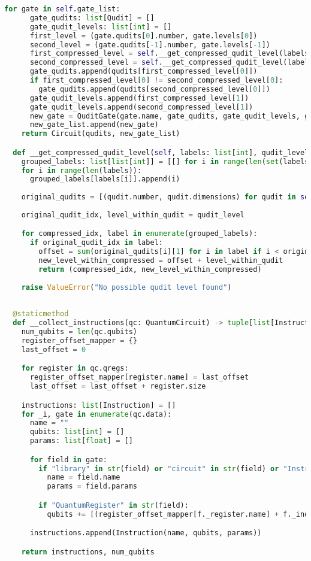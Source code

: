 \begin{lstlisting}[language=Python,caption=\texttt{circuit.py},label=lst:circuit.py]
    for gate in self.gate_list:
      gate_qudits: list[Qudit] = []
      gate_qudit_levels: list[int] = []
      first_level = (gate.qudits[0].number, gate.levels[0])
      second_level = (gate.qudits[-1].number, gate.levels[-1])
      first_compressed_level = self.__get_compressed_qudit_level(labels, first_level)
      second_compressed_level = self.__get_compressed_qudit_level(labels, second_level)
      gate_qudits.append(qudits[first_compressed_level[0]])
      if first_compressed_level[0] != second_compressed_level[0]:
        gate_qudits.append(qudits[second_compressed_level[0]])
      gate_qudit_levels.append(first_compressed_level[1])
      gate_qudit_levels.append(second_compressed_level[1])
      new_gate = QuditGate(gate.name, gate_qudits, gate_qudit_levels, gate.euler_angles)
      new_gate_list.append(new_gate)
    return Circuit(qudits, new_gate_list)   

  def __get_compressed_qudit_level(self, labels: list[int], qudit_level: tuple[int, int]) -> tuple[int, int]:
    grouped_labels: list[list[int]] = [[] for i in range(len(set(labels)))]
    for i in range(len(labels)):
      grouped_labels[labels[i]].append(i)
    
    original_qudits = [(qudit.number, qudit.dimensions) for qudit in self.qudits]
    
    original_qudit_idx, level_within_qudit = qudit_level

    for compressed_idx, label in enumerate(grouped_labels):
      if original_qudit_idx in label:
        offset = sum(original_qudits[i][1] for i in label if i < original_qudit_idx)
        new_level_within_compressed = offset + level_within_qudit
        return (compressed_idx, new_level_within_compressed)
    
    raise ValueError("No possible qudit level found")
    
  
  @staticmethod
  def __collect_instructions(qc: QuantumCircuit) -> tuple[list[Instruction], int]:
    num_qubits = len(qc.qubits)
    register_offset_mapper = {}
    last_offset = 0

    for register in qc.qregs:
      register_offset_mapper[register.name] = last_offset
      last_offset = last_offset + register.size

    instructions: list[Instruction] = []
    for _i, gate in enumerate(qc.data):
      name = ""
      qubits: list[int] = []
      params: list[float] = []

      for field in gate:
        if "library" in str(field) or "circuit" in str(field) or "Instruction" in str(field):
          name = field.name
          params = field.params

        if "QuantumRegister" in str(field):
          qubits += [(register_offset_mapper[f._register.name] + f._index) for f in field]

      instructions.append(Instruction(name, qubits, params))

    return instructions, num_qubits
  \end{lstlisting}
